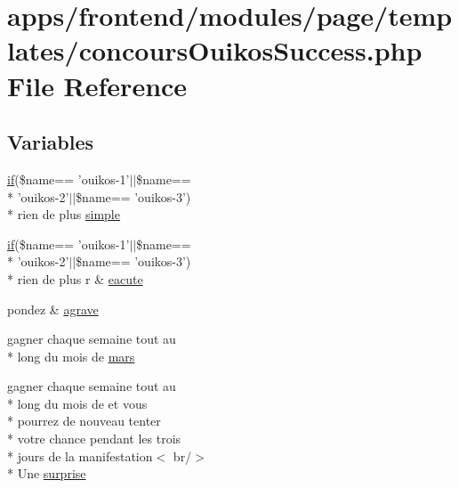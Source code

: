 \hypertarget{frontend_2modules_2page_2templates_2concours_ouikos_success_8php}{\section{apps/frontend/modules/page/templates/concours\-Ouikos\-Success.php File Reference}
\label{frontend_2modules_2page_2templates_2concours_ouikos_success_8php}
}
\subsection*{Variables}
\begin{DoxyCompactItemize}
\item 
\hyperlink{live_2modules_2tournament_2templates_2__form_team_8php_ae30a307b320d8da5d9a945eaf68f7549}{if}(\$name== 'ouikos-\/1'$|$$|$\$name== \\*
'ouikos-\/2'$|$$|$\$name== 'ouikos-\/3') \\*
rien de plus \hyperlink{frontend_2modules_2page_2templates_2concours_ouikos_success_8php_acf9918059e86404da5434fe38d192d62}{simple}
\item 
\hyperlink{live_2modules_2tournament_2templates_2__form_team_8php_ae30a307b320d8da5d9a945eaf68f7549}{if}(\$name== 'ouikos-\/1'$|$$|$\$name== \\*
'ouikos-\/2'$|$$|$\$name== 'ouikos-\/3') \\*
rien de plus r \& \hyperlink{frontend_2modules_2page_2templates_2concours_ouikos_success_8php_a5c9a34c76cebfd8ae481fa185a4530af}{eacute}
\item 
pondez \& \hyperlink{frontend_2modules_2page_2templates_2concours_ouikos_success_8php_adcbedde811e3c81b65c252edf38caea2}{agrave}
\item 
gagner chaque semaine tout au \\*
long du mois de \hyperlink{frontend_2modules_2page_2templates_2concours_ouikos_success_8php_a750c51d77a2a60f666d47fce2c5fa35b}{mars}
\item 
gagner chaque semaine tout au \\*
long du mois de et vous \\*
pourrez de nouveau tenter \\*
votre chance pendant les trois \\*
jours de la manifestation$<$ br/$>$\\*
 Une \hyperlink{frontend_2modules_2page_2templates_2concours_ouikos_success_8php_a1904ff8bd57e228d157eeb2bea88cacf}{surprise}

\end{DoxyCompactItemize}
